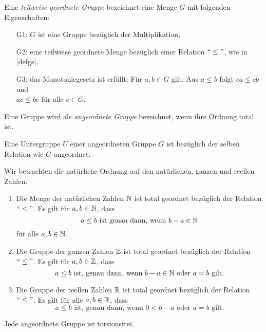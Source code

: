 %
\begin{defn}\label{twgG} %
Eine \textit{teilweise geordnete Gruppe} bezeichnet eine Menge $G$ mit folgenden Eigenschaften: 
%
\begin{enumerate}
\item[G1:] $G$ ist eine Gruppe bezüglich der Multiplikation,
\item[G2:] eine teilweise geordnete Menge bezüglich einer Relation $``\leq " $, wie in \ref{defgs}, 
\item[G3:] das Monotoniegesetz ist erfüllt: Für $a, b \in  G$ gilt: Aus $a \leq b$ folgt $ca \leq  cb$ und \\ $ac \leq bc$ für alle $c \in G$.
\end{enumerate}
% 
\end{defn}
%
%
\begin{defn}\label{agG}
Eine Gruppe wird als \textit{angeordnete Gruppe} bezeichnet, wenn ihre Ordnung total ist.
\end{defn}
%
%
%
\begin{bsp}\label{beispielUntergruppeAngeordnet}
Eine Untergruppe $U$ einer angeordneten Gruppe $G$ ist bezüglich der selben Relation wie $G$ angeordnet.
\end{bsp}
%
\begin{bsp}\label{OrdnungNundZ}
Wir betrachten die natürliche Ordnung auf den natürlichen, ganzen und reellen Zahlen.
\begin{enumerate}
\item Die Menge der natürlichen Zahlen $\mathbb{N}$ ist total geordnet bezüglich der Relation $``\leq "$. Es gilt für $a, b \in \mathbb{N}$, dass
\[ a \leq b \text{ ist genau dann, wenn } b-a \in \mathbb{N}
\]
für alle $a,b \in \mathbb{N}$.
\item Die Gruppe der ganzen Zahlen $\mathbb{Z}$ ist total geordnet bezüglich der Relation $``\leq "$. Es gilt für $a, b \in \mathbb{Z}$, dass
\[ a\leq b \text{ ist, genau dann, wenn } b -a \in \mathbb{N} \text{ oder } a = b \text{ gilt.}
\]
\item Die Gruppe der reellen Zahlen $\mathbb{R}$ ist total geordnet bezüglich der Relation $``\leq "$. Es gilt für alle $a, b \in \mathbb{R}$, dass
\[a \leq b \text{ ist, genau dann, wenn } 0 < b -a \text{ oder } a = b \text{ gilt.} 
\]
\end{enumerate}
\end{bsp}
%
% 
%
%
\begin{bem} \label{angeordnetFolgtTorsionsfrei} %
Jede angeordnete Gruppe ist torsionsfrei. 
\end{bem}
